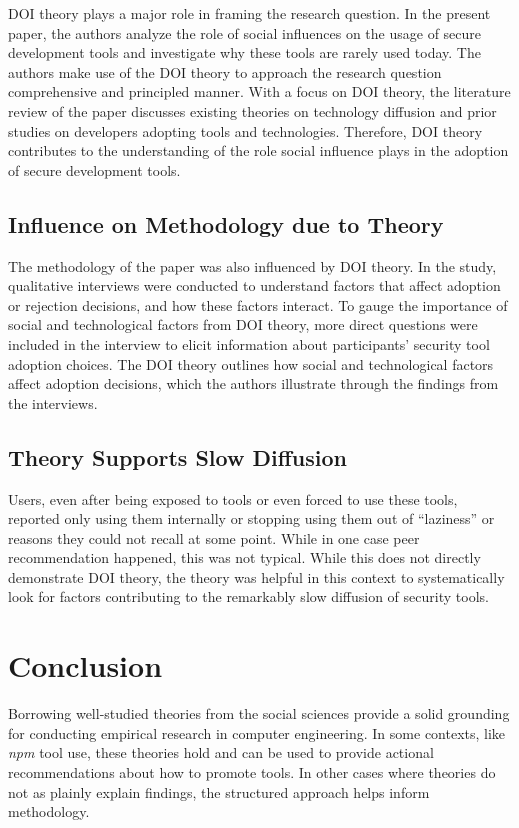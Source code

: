 \documentclass[journal,12pt,onecolumn,]{IEEEtran}
\begin{document}
DOI theory plays a major role in framing the research question.
In the present paper, the authors analyze the role of social influences on the usage of secure development tools and investigate why these tools are rarely used today.
The authors make use of the DOI theory to approach the research question comprehensive and principled manner.
With a focus on DOI theory, the literature review of the paper discusses existing theories on technology diffusion and prior studies on developers adopting tools and technologies.
Therefore, DOI theory contributes to the understanding of the role social influence plays in the adoption of secure development tools.


\subsection{Influence on Methodology due to Theory}

The methodology of the paper was also influenced by DOI theory.
In the study, qualitative interviews were conducted to understand factors that affect adoption or rejection decisions, and how these factors interact.
To gauge the importance of social and technological factors from DOI theory, more direct questions were included in the interview to elicit information about participants' security tool adoption choices.
The DOI theory outlines how social and technological factors affect adoption decisions, which the authors illustrate through the findings from the interviews.

\subsection{Theory Supports Slow Diffusion}

Users, even after being exposed to tools or even forced to use these tools, reported only using them internally or stopping using them out of ``laziness'' or reasons they could not recall at some point. While in one case peer recommendation happened, this was not typical. While this does not directly demonstrate DOI theory, the theory was helpful in this context to systematically look for factors contributing to the remarkably slow diffusion of security tools.

\section{Conclusion}

Borrowing well-studied theories from the social sciences provide a solid grounding for conducting empirical research in computer engineering. In some contexts, like \textit{npm} tool use, these theories hold and can be used to provide actional recommendations about how to promote tools. In other cases where theories do not as plainly explain findings, the structured approach helps inform methodology.



\end{document}
